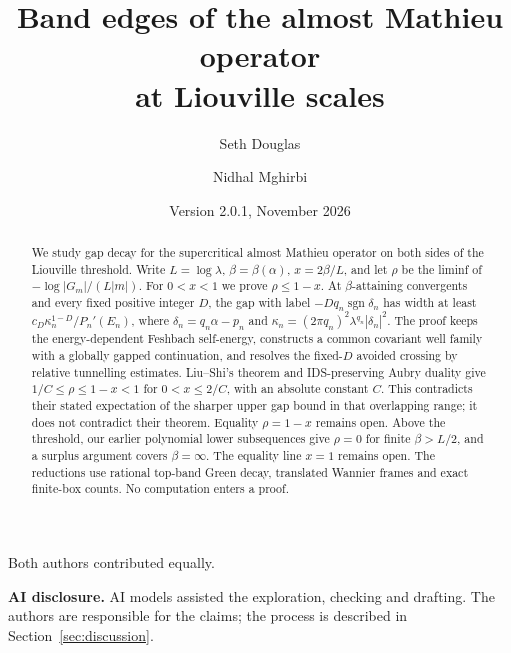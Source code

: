 \documentclass[11pt]{article}
\title{Band edges of the almost Mathieu operator\\ at Liouville scales}
\author{Seth Douglas \and Nidhal Mghirbi}
\date{Version 2.0.1, November 2026}
\theoremstyle{definition}
\theoremstyle{plain}
\newcommand{\sgn}{\operatorname{sgn}}
\begin{document}
\maketitle
\begin{center}\small Both authors contributed equally.\end{center}
\begin{abstract}
We study gap decay for the supercritical almost Mathieu operator on both sides of the Liouville threshold. Write $L=\log\lambda$, $\beta=\beta(\alpha)$, $x=2\beta/L$, and let $\rho$ be the liminf of $-\log|G_m|/(L|m|)$. For $0<x<1$ we prove $\rho\le1-x$. At $\beta$-attaining convergents and every fixed positive integer $D$, the gap with label $-Dq_n\sgn\delta_n$ has width at least $c_D\kappa_n^{1-D}/P_n'(E_n)$, where $\delta_n=q_n\alpha-p_n$ and $\kappa_n=(2\pi q_n)^2\lambda^{q_n}|\delta_n|^2$. The proof keeps the energy-dependent Feshbach self-energy, constructs a common covariant well family with a globally gapped continuation, and resolves the fixed-$D$ avoided crossing by relative tunnelling estimates. Liu--Shi's theorem and IDS-preserving Aubry duality give $1/C\le\rho\le1-x<1$ for $0<x\le2/C$, with an absolute constant $C$. This contradicts their stated expectation of the sharper upper gap bound in that overlapping range; it does not contradict their theorem. Equality $\rho=1-x$ remains open. Above the threshold, our earlier polynomial lower subsequences give $\rho=0$ for finite $\beta>L/2$, and a surplus argument covers $\beta=\infty$. The equality line $x=1$ remains open. The reductions use rational top-band Green decay, translated Wannier frames and exact finite-box counts. No computation enters a proof.
\end{abstract}
\noindent\textbf{AI disclosure.} AI models assisted the exploration, checking and drafting. The authors are responsible for the claims; the process is described in Section~\ref{sec:discussion}.

{\small\tableofcontents}








\appendix















\end{document}
